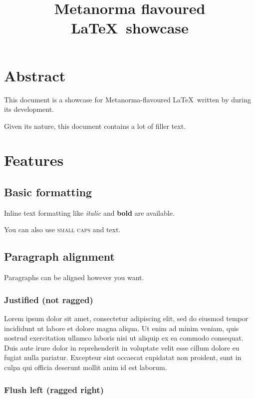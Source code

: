 \documentclass{metanorma}
\title{Metanorma flavoured \LaTeX\ showcase}
\begin{document}
\maketitle

\tableofcontents

\section{Abstract}

This document is a showcase for Metanorma-flavoured \LaTeX\ written by
 during its development.

\begin{note}
  Given its nature, this document contains a lot of filler text.
\end{note}

\section{Features}

\subsection{Basic formatting}

Inline text formatting like \textit{italic} and \textbf{bold} are available.

You can also use \textsc{small caps} and  text.

\subsection{Paragraph alignment}

Paragraphs can be aligned however you want.

\subsubsection{Justified (not ragged)}

Lorem ipsum dolor sit amet, consectetur adipiscing elit, sed do eiusmod tempor incididunt ut labore et dolore magna aliqua. Ut enim ad minim veniam, quis nostrud exercitation ullamco laboris nisi ut aliquip ex ea commodo consequat. Duis aute irure dolor in reprehenderit in voluptate velit esse cillum dolore eu fugiat nulla pariatur. Excepteur sint occaecat cupidatat non proident, sunt in culpa qui officia deserunt mollit anim id est laborum.

\subsubsection{Flush left (ragged right)}
\end{document}
